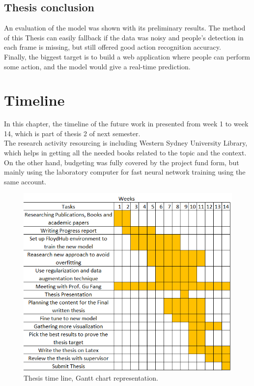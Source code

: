 \subsection{Thesis conclusion}
\hspace{5mm} An evaluation of the model was shown with its preliminary results. The method of this Thesis can easily fallback if the data was noisy and people's detection in each frame is missing, but still offered good action recognition accuracy.\\
Finally, the biggest target is to build a web application where people can perform some action, and the model would give a real-time prediction.\\
\section{Timeline}
\hspace{5mm} In this chapter, the timeline of the future work in presented from week 1 to week 14, which is part of thesis 2 of next semester.\\

The research activity resourcing is including Western Sydney University Library, which helps in getting all the needed books related to the topic and the context. On the other hand, budgeting was fully covered by the project fund form, but mainly using the laboratory computer for fast neural network training using the same account.
\begin{figure}[ht]
    \centering
    \includegraphics{Figures/fc.PNG}
    \decoRule
    \caption [Thesis time line, Gantt chart representation.]{Thesis time line, Gantt chart representation.}
    \label{fig:la}
    \end{figure}\hfill \\

